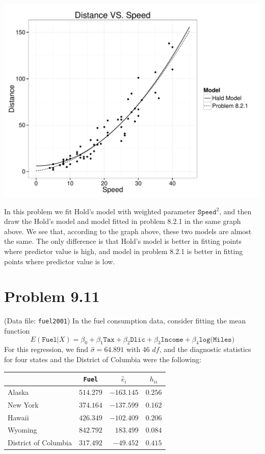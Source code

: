 \documentclass[12pt,oneside,a4paper]{article}\usepackage[]{graphicx}\usepackage[]{xcolor}
\newenvironment{knitrout}{}{} %
\newcommand{\problem}[1]
{
    \clearpage
    \section*{Problem {#1}}
}
\newcommand{\m}[1]{\texttt{{#1}}}
\begin{document}
\begin{knitrout}
{\centering \includegraphics[width=.8\linewidth]{figure/p824} 

}



\end{knitrout}

In this problem we fit Hold's model with weighted parameter $\m{Speed}^2$, and then draw the Hold's model and model fitted in problem 8.2.1 in the same graph above. We see that, according to the graph above, these two models are almost the same. The only difference is that Hold's model is better in fitting points where predictor value is high, and model in problem 8.2.1 is better in fitting points where predictor value is low.

\problem{9.11}
(Data file: \m{fuel2001}) In the fuel consumption data, consider fitting the mean function
$$E(\m{Fuel}|X) = \beta_{0} + \beta_{1}\m{Tax} + \beta_{2}\m{Dlic} + \beta_{3}\m{Income} + \beta_{4}\m{log(Miles)}$$
For this regression, we find $\hat{\sigma} = 64.891$ with 46 $df$, and the diagnostic statistics for four states and the District of Columbia were the following:

\begin{table}[ht!]
\centering
\begin{tabular}{lrrr}
\toprule
 \multicolumn{1}{c}{  } & \multicolumn{1}{c}{ \m{Fuel} } & \multicolumn{1}{c}{ $\hat{e}_{i}$ } & \multicolumn{1}{c}{ $h_{ii}$ } \\
\midrule
 Alaska & $514.279$ & $-163.145$ & $0.256$ \\
 New York & $374.164$ & $-137.599$ & $0.162$ \\
 Hawaii & $426.349$ & $-102.409$ & $0.206$ \\
 Wyoming & $842.792$ & $183.499$ & $0.084$ \\
 District of Columbia & $317.492$ & $-49.452$ & $0.415$ \\
\bottomrule
\end{tabular}
\end{table}
\end{document}

